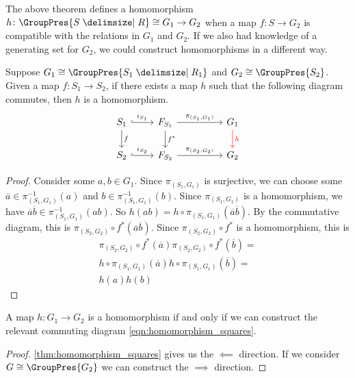 The above theorem defines a homomorphism $h \colon \GroupPres{S \relations R} \cong G_1 \to G_2$ when a map $f \colon S \to G_2$ is compatible with the relations in $G_1$ and $G_2$.
If we also had knowledge of a generating set for $G_2$, we could construct homomorphisms in a different way.
\begin{theorem}
	Suppose $G_1 \cong \GroupPres{S_1 \relations R_1}$ and $G_2 \cong \GroupPres{S_2}$.
	Given a map $f \colon S_1 \to S_2$, if there exists a map  $h$ such that the following diagram commutes, then $h$ is a homomorphism.
	\begin{equation}
		\begin{tikzcd}
			S_1 \ar[d, "f"] \ar[r, hook, "i_{S_1}"] & F_{S_1} \ar[d, "f^*"] \ar[rr, "\pi_{(S_1, G_1)}"] & & \ar[d, color=red, "h"] G_1 \\
			S_2 \ar[r, hook, "i_{S_2}"] & F_{S_2} \ar[rr, "\pi_{(S_2, G_2)}"] & & G_2
		\end{tikzcd}
		\label{eqn:homomorphism_squares}
	\end{equation}
	\label{thm:homomorphism_squares}
\end{theorem}
\begin{proof}
	Consider some $a,b \in G_1$.
	Since $\pi_{(S_1,G_1)}$ is surjective, we can choose some $\overline{a} \in \pi_{(S_1,G_1)}^{-1}(a)$ and $b \in \pi_{(S_1,G_1)}^{-1}(b)$.
	Since $\pi_{(S_1,G_1)}$ is a homomorphism, we have $\overline{a}\overline{b} \in \pi_{(S_1,G_1)}^{-1}(ab)$.
	So $h(ab) = h \circ \pi_{(S_1,G_1)}(\overline{a}\overline{b})$.
	By the commutative diagram, this is $\pi_{(S_2,G_2)} \circ f^* (\overline{a}\overline{b})$.
	Since $\pi_{(S_2,G_2)} \circ f^*$ is a homomorphism, this is
	\begin{align*}
		\pi_{(S_2,G_2)} \circ f^*\left(\overline{a}\right)\pi_{(S_2,G_2)} \circ f^*\left(\overline{b}\right) =
		\\ h \circ \pi_{(S_1,G_1)}\left( \overline{a} \right) h \circ \pi_{(S_1,G_1)}\left( \overline{b} \right) =
		\\ h(a)h(b)
	\end{align*}
\end{proof}

\begin{corollary}
	A map $h \colon G_1 \to G_2$ is a homomorphism if and only if we can construct the relevant commuting diagram \eqref{eqn:homomorphism_squares}.
\end{corollary}
\begin{proof}
	\cref{thm:homomorphism_squares} gives us the $\impliedby$ direction.
	If we consider $G \cong \GroupPres{G_2}$ we can construct the  $\implies$ direction.
\end{proof}

